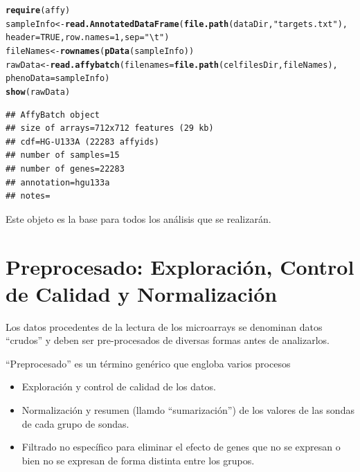 \documentclass[a4paper]{article}\usepackage[]{graphicx}\usepackage[]{color}
\makeatletter
\newcommand{\hlnum}[1]{\textcolor[rgb]{0.686,0.059,0.569}{#1}}%
\newcommand{\hlstr}[1]{\textcolor[rgb]{0.192,0.494,0.8}{#1}}%
\newcommand{\hlstd}[1]{\textcolor[rgb]{0.345,0.345,0.345}{#1}}%
\newcommand{\hlkwb}[1]{\textcolor[rgb]{0.69,0.353,0.396}{#1}}%
\newcommand{\hlkwc}[1]{\textcolor[rgb]{0.333,0.667,0.333}{#1}}%
\newcommand{\hlkwd}[1]{\textcolor[rgb]{0.737,0.353,0.396}{\textbf{#1}}}%
\newenvironment{kframe}{%
 \def\at@end@of@kframe{}%
 \ifinner\ifhmode%
  \def\at@end@of@kframe{\end{minipage}}%
  \begin{minipage}{\columnwidth}%
 \fi\fi%
 \def\FrameCommand##1{\hskip\@totalleftmargin \hskip-\fboxsep
 \colorbox{shadecolor}{##1}\hskip-\fboxsep
     \hskip-\linewidth \hskip-\@totalleftmargin \hskip\columnwidth}%
 \MakeFramed {\advance\hsize-\width
   \@totalleftmargin\z@ \linewidth\hsize
   \@setminipage}}%
 {\par\unskip\endMakeFramed%
 \at@end@of@kframe}
\newenvironment{knitrout}{}{} %
\makeatother
\begin{document}
\begin{knitrout}
\color{fgcolor}\begin{kframe}
\begin{alltt}
\hlkwd{require}\hlstd{(affy)}
\hlstd{sampleInfo} \hlkwb{<-} \hlkwd{read.AnnotatedDataFrame}\hlstd{(}\hlkwd{file.path}\hlstd{(dataDir,}\hlstr{"targets.txt"}\hlstd{),}
    \hlkwc{header} \hlstd{=} \hlnum{TRUE}\hlstd{,} \hlkwc{row.names} \hlstd{=} \hlnum{1}\hlstd{,} \hlkwc{sep}\hlstd{=}\hlstr{"\textbackslash{}t"}\hlstd{)}
\hlstd{fileNames} \hlkwb{<-} \hlkwd{rownames}\hlstd{(}\hlkwd{pData}\hlstd{(sampleInfo))}
\hlstd{rawData} \hlkwb{<-} \hlkwd{read.affybatch}\hlstd{(}\hlkwc{filenames}\hlstd{=}\hlkwd{file.path}\hlstd{(celfilesDir,fileNames),}
                          \hlkwc{phenoData}\hlstd{=sampleInfo)}
\hlkwd{show}\hlstd{(rawData)}
\end{alltt}


{\ttfamily\noindent\color{warningcolor}{\#\# Warning: replacing previous import 'AnnotationDbi::tail' by 'utils::tail' when loading 'hgu133acdf'}}

{\ttfamily\noindent\color{warningcolor}{\#\# Warning: replacing previous import 'AnnotationDbi::head' by 'utils::head' when loading 'hgu133acdf'}}

{\ttfamily\noindent\itshape\color{messagecolor}{\#\# }}\begin{verbatim}
## AffyBatch object
## size of arrays=712x712 features (29 kb)
## cdf=HG-U133A (22283 affyids)
## number of samples=15
## number of genes=22283
## annotation=hgu133a
## notes=
\end{verbatim}
\end{kframe}
\end{knitrout}

Este objeto es la base para todos los análisis que se realizarán.


\section{Preprocesado: Exploración, Control de Calidad y Normalización}

Los datos procedentes de la lectura de los microarrays se denominan datos ``crudos'' y deben ser pre-procesados de diversas formas antes de analizarlos.

``Preprocesado'' es un término genérico que engloba varios procesos
\begin{itemize}
\item Exploración y control de calidad de los datos.
\item Normalización y resumen (llamdo ``sumarización'') de los valores de las sondas de cada grupo de sondas.
\item Filtrado no específico para eliminar el efecto de genes que no se expresan o bien no se expresan de forma distinta entre los grupos.
\end{itemize}
\end{document}
